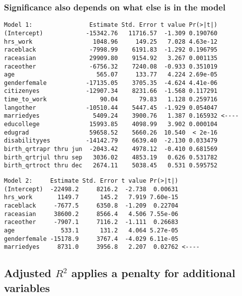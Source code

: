 \documentclass[11pt,containsverbatim,handout,xcolor=xelatex,dvipsnames,table]{beamer}
\begin{document}
\begin{frame}[fragile]
\frametitle{Significance also depends on what else is in the model}

{\tiny
\begin{Verbatim}[frame=single, formatcom=\color{gray}]
Model 1:                Estimate Std. Error t value Pr(>|t|)    
(Intercept)            -15342.76   11716.57  -1.309 0.190760    
hrs_work                 1048.96     149.25   7.028 4.63e-12 
raceblack               -7998.99    6191.83  -1.292 0.196795    
raceasian               29909.80    9154.92   3.267 0.001135 
raceother               -6756.32    7240.08  -0.933 0.351019   
age                       565.07     133.77   4.224 2.69e-05 
genderfemale           -17135.05    3705.35  -4.624 4.41e-06 
citizenyes             -12907.34    8231.66  -1.568 0.117291    
time_to_work               90.04      79.83   1.128 0.259716    
langother              -10510.44    5447.45  -1.929 0.054047  
marriedyes               5409.24    3900.76   1.387 0.165932 <----    
educollege              15993.85    4098.99   3.902 0.000104 
edugrad                 59658.52    5660.26  10.540  < 2e-16 
disabilityyes          -14142.79    6639.40  -2.130 0.033479   
birth_qrtrapr thru jun  -2043.42    4978.12  -0.410 0.681569    
birth_qrtrjul thru sep   3036.02    4853.19   0.626 0.531782    
birth_qrtroct thru dec   2674.11    5038.45   0.531 0.595752    
\end{Verbatim}
}
\pause
{\tiny
\begin{Verbatim}[frame=single, formatcom=\color{gray}]
Model 2:     Estimate Std. Error t value Pr(>|t|)    
(Intercept)  -22498.2     8216.2  -2.738  0.00631
hrs_work       1149.7      145.2   7.919 7.60e-15
raceblack     -7677.5     6350.8  -1.209  0.22704    
raceasian     38600.2     8566.4   4.506 7.55e-06
raceother     -7907.1     7116.2  -1.111  0.26683    
age             533.1      131.2   4.064 5.27e-05
genderfemale -15178.9     3767.4  -4.029 6.11e-05
marriedyes     8731.0     3956.8   2.207  0.02762 <----
\end{Verbatim}
}

\end{frame}


\subsection{Adjusted $R^2$ applies a penalty for additional variables}
\label{mi4}
\end{document}
